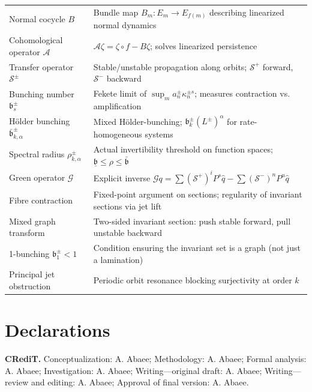 \documentclass[11pt,a4paper]{article}
\theoremstyle{plain}
\theoremstyle{definition}
\theoremstyle{remark}
\numberwithin{equation}{section}
\numberwithin{figure}{section}
\begin{document}
\begin{tabularx}{\textwidth}{l X}
Normal cocycle $B$ & Bundle map $B_m:E_m\to E_{f(m)}$ describing linearized normal dynamics \\
Cohomological operator $\mathcal A$ & $\mathcal A\zeta = \zeta\circ f - B\zeta$; solves linearized persistence \\
Transfer operator $\mathcal S^\pm$ & Stable/unstable propagation along orbits; $\mathcal S^+$ forward, $\mathcal S^-$ backward \\
Bunching number $\mathfrak b^\pm_s$ & Fekete limit of $\sup_m a_n^\pm \kappa_n^{\pm s}$; measures contraction vs. amplification \\
Hölder bunching $\bar{\mathfrak b}^\pm_{k,\alpha}$ & Mixed Hölder-bunching; $\mathfrak b^\pm_k(L^\pm)^\alpha$ for rate-homogeneous systems \\
Spectral radius $\rho^\pm_{k,\alpha}$ & Actual invertibility threshold on function spaces; $\underline{\mathfrak b}\le\rho\le\bar{\mathfrak b}$ \\
Green operator $\mathcal G$ & Explicit inverse $\mathcal Gq=\sum(\mathcal S^+)^iP^s\hat q-\sum(\mathcal S^-)^nP^u\hat q$ \\
Fibre contraction & Fixed-point argument on sections; regularity of invariant sections via jet lift \\
Mixed graph transform & Two-sided invariant section: push stable forward, pull unstable backward \\
1-bunching $\mathfrak b_1^\pm<1$ & Condition ensuring the invariant set is a graph (not just a lamination) \\
Principal jet obstruction & Periodic orbit resonance blocking surjectivity at order $k$ \\
\end{tabularx}

\section*{Declarations}

\noindent \textbf{CRediT.} Conceptualization: A. Abaee; Methodology: A. Abaee; Formal analysis: A. Abaee; Investigation: A. Abaee; Writing—original draft: A. Abaee; Writing—review and editing: A. Abaee; Approval of final version: A. Abaee.

\vspace{0.5em}
\end{document}
